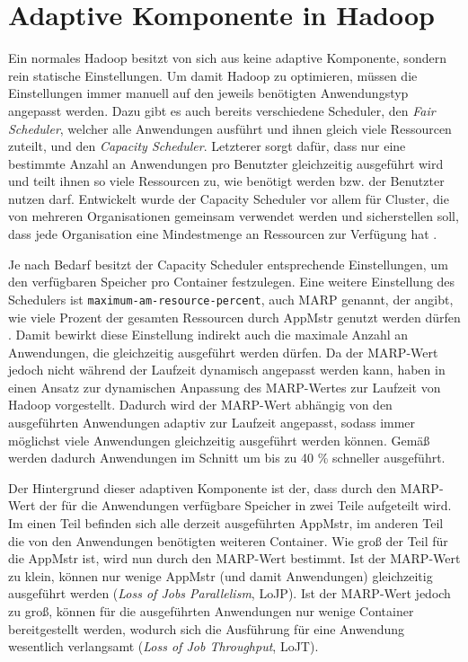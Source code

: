 \section{Adaptive Komponente in Hadoop}\label{sec:inriaSetting}


Ein normales Hadoop besitzt von sich aus keine adaptive Komponente, sondern rein statische Einstellungen. Um damit Hadoop zu optimieren, müssen die Einstellungen immer manuell auf den jeweils benötigten Anwendungstyp angepasst werden. Dazu gibt es auch bereits verschiedene Scheduler, den \emph{Fair Scheduler}, welcher alle Anwendungen ausführt und ihnen gleich viele Ressourcen zuteilt, und den \emph{Capacity Scheduler}. Letzterer sorgt dafür, dass nur eine bestimmte Anzahl an Anwendungen pro Benutzter gleichzeitig ausgeführt wird und teilt ihnen so viele Ressourcen zu, wie benötigt werden bzw. der Benutzter nutzen darf. Entwickelt wurde der Capacity Scheduler vor allem für Cluster, die von mehreren Organisationen gemeinsam verwendet werden und sicherstellen soll, dass jede Organisation eine Mindestmenge an Ressourcen zur Verfügung hat \cite{HadoopCapScheduler271}.

Je nach Bedarf besitzt der Capacity Scheduler entsprechende Einstellungen, um \zB den verfügbaren Speicher pro Container festzulegen. Eine weitere Einstellung des Schedulers ist \texttt{maximum-am-resource-percent}, auch MARP genannt, der angibt, wie viele Prozent der gesamten Ressourcen durch \ac{AppMstr} genutzt werden dürfen \cite{HadoopCapScheduler271}. Damit bewirkt diese Einstellung indirekt auch die maximale Anzahl an Anwendungen, die gleichzeitig ausgeführt werden dürfen. Da der MARP-Wert jedoch nicht während der Laufzeit dynamisch angepasst werden kann, haben \citeauthor{zhang2016} in \cite{zhang2016} einen Ansatz zur dynamischen Anpassung des MARP-Wertes zur Laufzeit von Hadoop vorgestellt. Dadurch wird der MARP-Wert abhängig von den ausgeführten Anwendungen adaptiv zur Laufzeit angepasst, sodass immer möglichst viele Anwendungen gleichzeitig ausgeführt werden können. Gemäß \citeauthor{zhang2016} werden dadurch Anwendungen im Schnitt um bis zu 40 \% schneller ausgeführt.

Der Hintergrund dieser adaptiven Komponente ist der, dass durch den MARP-Wert der für die Anwendungen verfügbare Speicher in zwei Teile aufgeteilt wird. Im einen Teil befinden sich alle derzeit ausgeführten \ac{AppMstr}, im anderen Teil die von den Anwendungen benötigten weiteren Container. Wie groß der Teil für die \ac{AppMstr} ist, wird nun durch den MARP-Wert bestimmt. Ist der MARP-Wert zu klein, können nur wenige \ac{AppMstr} (und damit Anwendungen) gleichzeitig ausgeführt werden (\emph{Loss of Jobs Parallelism}, LoJP). Ist der MARP-Wert jedoch zu groß, können für die ausgeführten Anwendungen nur wenige Container bereitgestellt werden, wodurch sich die Ausführung für eine Anwendung wesentlich verlangsamt (\emph{Loss of Job Throughput}, LoJT)\cite{zhang2016}.

